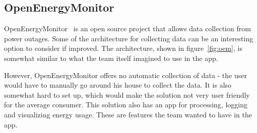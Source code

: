 \begin{figure}[H]
\label{fig:smartly}
  \centering
\quad
\end{figure}
\newpage


\subsection{OpenEnergyMonitor}

OpenEnergyMonitor~\cite{openenergymonitor} is an open source project that allows data collection from power outages. Some of the architecture for collecting data can be an interesting option to consider if improved. The architecture, shown in figure~\ref{fig:oem}, is somewhat similar to what the team itself imagined to use in the app. 

However, OpenEnergyMonitor offers no automatic collection of data - the user would have to manually go around his house to collect the data. It is also somewhat hard to set up, which would make the solution not very user friendly for the average consumer. This solution also has an app for processing, logging and visualizing energy usage. These are features the team wanted to have in the app.

